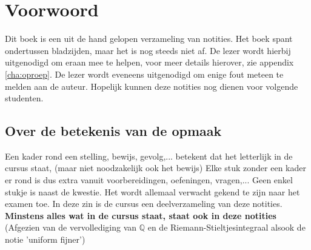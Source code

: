 \documentclass[main.tex]{subfiles}
\begin{document}
\section*{Voorwoord}
\label{sec:voorwoord}

Dit boek is een uit de hand gelopen verzameling van notities.
Het boek spant ondertussen \pageref{LastPage} bladzijden, maar het is nog steeds niet af.
De lezer wordt hierbij uitgenodigd om eraan mee te helpen, voor meer details hierover, zie appendix \ref{cha:oproep}.
De lezer wordt eveneens uitgenodigd om enige fout meteen te melden aan de auteur.
Hopelijk kunnen deze notities nog dienen voor volgende studenten.

\subsection*{Over de betekenis van de opmaak}
\label{sec:over-de-betekenis}

Een kader rond een stelling, bewijs, gevolg,... betekent dat het letterlijk in de cursus staat, (maar niet noodzakelijk ook het bewijs)
Elke stuk zonder een kader er rond is dus extra vanuit voorbereidingen, oefeningen, vragen,... 
Geen enkel stukje is naast de kwestie.
Het wordt allemaal verwacht gekend te zijn naar het examen toe.
In deze zin is de cursus een deelverzameling van deze notities.
\textbf{Minstens alles wat in de cursus staat, staat ook in deze notities}
(Afgezien van de vervollediging van $\mathbb{Q}$ en de Riemann-Stieltjesintegraal alsook de notie 'uniform fijner')
\end{document}
